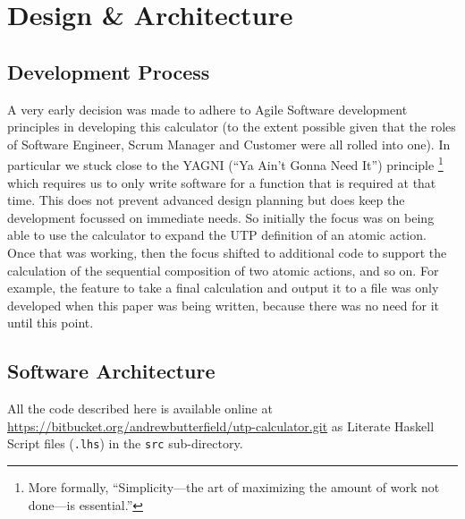 \section{Design \& Architecture}\label{sec:Design}

\subsection{Development Process}\label{ssec:development}

A very early decision was made to adhere to Agile Software development
principles \cite{Fowl01a}
in developing this calculator
(to the extent possible given that the roles of Software Engineer, Scrum Manager
and Customer were all rolled into one).
In particular we stuck close to the YAGNI (``Ya Ain't Gonna Need It'') principle%
\footnote{More formally, ``Simplicity---the art of maximizing the amount
of work not done---is essential.''}
which requires us to only write software for a function
that is required at that time.
This does not prevent advanced design planning but does keep
the development focussed on immediate needs.
So initially the focus was on being able to use the calculator
to expand the UTP definition of an atomic action.
Once that was working, then the focus shifted to additional code to
support the calculation of the sequential composition of two atomic actions,
and so on.
For example, the feature to take a final calculation and output it to a file
was only developed when this paper was being written,
because there was no need for it until this point.

\subsection{Software Architecture}\label{ssec:architecture}

All the code described here is available online
at
\\\url{https://bitbucket.org/andrewbutterfield/utp-calculator.git}
as Literate Haskell Script files (\texttt{.lhs})
in the \texttt{src} sub-directory.

